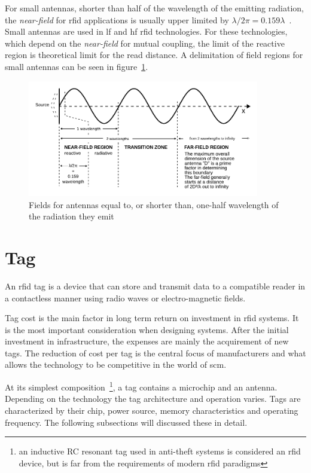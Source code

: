 For small antennas, shorter than half of the wavelength of the emitting radiation, the \emph{near-field} for \ac{rfid} applications is usually upper limited by $\lambda / 2\pi = 0.159\lambda$~\cite{nikitinOverviewFieldUHF2007a}.
Small antennas are used in \ac{lf} and \ac{hf} \ac{rfid} technologies.
For these technologies, which depend on the \emph{near-field} for mutual coupling, the limit of the reactive region is theoretical limit for the read distance.
A delimitation of field regions for small antennas can be seen in figure~\ref{fig:fieldregionsshortantenna}.

\begin{figure}[!ht]
    \centering
    \includegraphics[width=0.9\textwidth]{./figs/02-state-of-the-art/Field_regions_for_typical_antennas_vector.pdf}
    \caption{Fields for antennas equal to, or shorter than, one-half wavelength of the radiation they emit~\cite{SafetyHealthTopics}} 
    \label{fig:fieldregionsshortantenna}
\end{figure}

\section{Tag} \label{sec:tag}

An \ac{rfid} tag is a device that can store and transmit data to a compatible reader in a contactless manner using radio waves or electro-magnetic fields.

Tag cost is the main factor in long term return on investment in \ac{rfid} systems. It is the most important consideration when designing systems. After the initial investment in infrastructure, the expenses are mainly the acquirement of new tags.
The reduction of cost per tag is the central focus of manufacturers and what allows the technology to be competitive in the world of \ac{scm}.

At its simplest composition~\footnote{an inductive RC resonant tag used in anti-theft systems is considered an \ac{rfid} device, but is far from the requirements of modern \ac{rfid} paradigms}, a tag contains a microchip and an antenna.
Depending on the technology the tag architecture and operation varies.
Tags are characterized by their chip, power source, memory characteristics and operating frequency. The following subsections will discussed these in detail.

